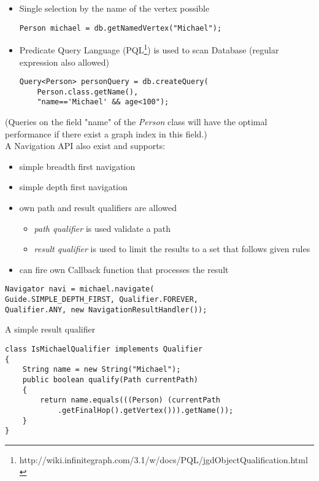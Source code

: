 
\begin{itemize}
\item Single selection by the name of the vertex possible
\begin{lstlisting}[caption=(Point query)]
Person michael = db.getNamedVertex("Michael");
\end{lstlisting}
\item Predicate Query Language (PQL\footnote{http://wiki.infinitegraph.com/3.1/w/docs/PQL/jgdObjectQualification.html}) is used to scan Database (regular expression also allowed)
\begin{lstlisting}[caption=(Range query)]
Query<Person> personQuery = db.createQuery(
	Person.class.getName(), 
	"name=='Michael' && age<100");
\end{lstlisting}
\end{itemize}
(Queries on the field "name" of the \textit{Person} class will have the optimal performance if there exist a graph index in this field.) \\


A Navigation API also exist and supports:
\begin{itemize}
\item simple breadth first navigation
\item simple depth first navigation
\item own path and result qualifiers are allowed
\begin{itemize}
\item \textit{path qualifier} is used validate a path
\item \textit{result qualifier} is used to limit the results to a set that follows given rules
\end{itemize}
\item can fire own Callback function that processes the result
\end{itemize}
\begin{lstlisting}[caption=(Creating a simple Navigator)]
Navigator navi = michael.navigate(
Guide.SIMPLE_DEPTH_FIRST, Qualifier.FOREVER, 
Qualifier.ANY, new NavigationResultHandler());
\end{lstlisting}


A simple result qualifier 
\begin{lstlisting}[caption=(Result qualifier)]
class IsMichaelQualifier implements Qualifier
{
    String name = new String("Michael");
    public boolean qualify(Path currentPath)
    {
        return name.equals(((Person) (currentPath
            .getFinalHop().getVertex())).getName());
    }
}
\end{lstlisting}
